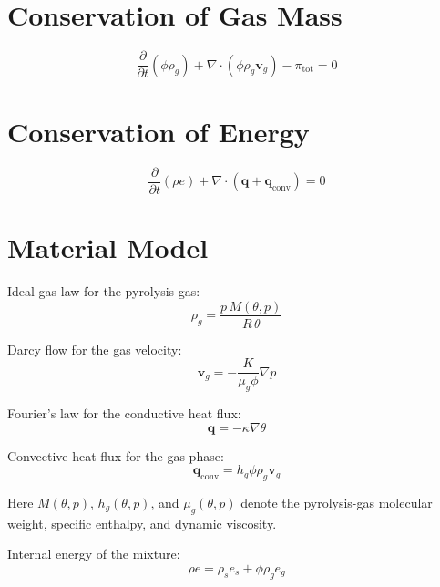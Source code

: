 \documentclass[11pt]{article}
\begin{document}
\section{Conservation of Gas Mass}

\begin{equation}
\frac{\partial}{\partial t}\left(\phi \rho_g\right)
+ \nabla \cdot
\left(
\phi \rho_g \mathbf{v}_g
\right)
- \pi_{\mathrm{tot}}
= 0
\end{equation}

\section{Conservation of Energy}

\begin{equation}
\frac{\partial }{\partial t} \left( \rho e \right) + \nabla \cdot \left( \mathbf{q} + \mathbf{q}_{\mathrm{conv}} \right) = 0
\end{equation}

\section{Material Model}

Ideal gas law for the pyrolysis gas:
\begin{equation}
\rho_g = \frac{p\,M(\theta,p)}{R\,\theta}
\end{equation}

Darcy flow for the gas velocity:
\begin{equation}
\mathbf{v}_g = -\frac{K}{\mu_g \phi} \nabla p
\end{equation}

Fourier's law for the conductive heat flux:
\begin{equation}
\mathbf{q} = -\kappa \nabla \theta
\end{equation}

Convective heat flux for the gas phase:
\begin{equation}
\mathbf{q}_{\mathrm{conv}} = h_g \phi \rho_g \mathbf{v}_g
\end{equation}

Here $M(\theta,p)$, $h_g(\theta,p)$, and $\mu_g(\theta,p)$ denote the pyrolysis-gas
molecular weight, specific enthalpy, and dynamic viscosity.

Internal energy of the mixture:
\begin{equation}
\rho e = \rho_s e_s + \phi \rho_g e_g
\end{equation}
\end{document}
